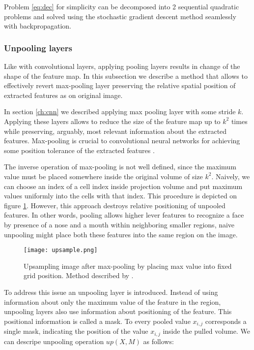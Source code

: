 Problem \ref{eq:dec} for simplicity can be decomposed into 2 sequential quadratic problems and solved using the stochastic gradient descent method seamlessly with backpropagation.

\subsubsection{Unpooling layers}

Like with convolutional layers, applying pooling layers results in change of the shape of the feature map.
In this subsection we describe a method that allows to effectively revert max-pooling layer preserving the relative spatial position of extracted features as on original image.

In section \ref{ch:cnn} we described applying max pooling layer with some stride $k$.
Applying these layers allows to reduce the size of the feature map up to $k^2$ times while preserving, arguably, most relevant information about the extracted features.
Max-pooling is crucial to convolutional neural networks for achieving some position tolerance of the extracted features \cite{Jaderberg2015}.

The inverse operation of max-pooling is not well defined, since the maximum value must be placed somewhere inside the original volume of size $k^2$. Naively, we can choose an index of a cell index inside projection volume and put maximum values uniformly into the cells with that index.
This procedure is depicted on figure \ref{fig:pool}.
However, this approach destroys relative positioning of unpooled features.
In other words, pooling allows higher lever features to recognize a face by presence of a nose and a mouth within neighboring smaller regions, naive unpooling might place both these features into the same region on the image.

\begin{figure}[h!]
  \centering
    \texttt{[image: upsample.png]}
  \caption{Upsampling image after max-pooling by placing max value into fixed grid position. Method described by \cite{Dosovitskiy2015a}.}
  \label{fig:pool}
\end{figure}

To address this issue an unpooling layer is introduced. Instead of using information about only the maximum value of the feature in the region, unpooling layers also use information about positioning of the feature. This positional information is called a mask. To every pooled value $x_{i,j}$ corresponds a single mask, indicating the position of the value $x_{i,j}$ inside the pulled volume. We can descripe unpooling operation $up(X, M)$ as follows:

